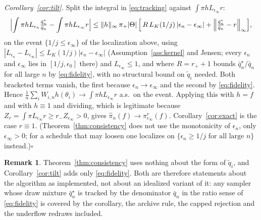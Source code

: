 \documentclass[10pt]{article}
\theoremstyle{plain}
\theoremstyle{definition}
\newtheorem{remark}{Remark}
\begin{document}
\emph{Corollary~\ref{cor:tilt}.} Split the integral in \eqref{eq:tracking} against $\int\pi hL_{\epsilon_\infty}r$:
\[
\Bigl|\int \pi h L_{\epsilon_n}\tfrac{\bar q^\star_n}{\bar q_n}-\int\pi hL_{\epsilon_\infty}r\Bigr|
\le \|h\|_\infty\,\pi_+|\Theta|\,\Bigl[\,R\,L_K(1/j)\,|\epsilon_n-\epsilon_\infty|
+\Bigl\|\tfrac{\bar q^\star_n}{\bar q_n}-r\Bigr\|_\infty\Bigr],
\]
on the event $\{1/j\le\epsilon_\infty\}$ of the localization above, using $|L_{\epsilon_n}-L_{\epsilon_\infty}|\le L_K(1/j)|\epsilon_n-\epsilon_\infty|$ (Assumption~\ref{ass:kernel} and Jensen; every $\epsilon_n$ and $\epsilon_\infty$ lies in $[1/j,\epsilon_0]$ there) and $L_{\epsilon_\infty}\le1$, and where $R=r_++1$ bounds $\bar q^\star_n/\bar q_n$ for all large $n$ by \eqref{eq:fidelity}, with no structural bound on $\tilde q_i$ needed. Both bracketed terms vanish, the first because $\epsilon_n\to\epsilon_\infty$ and the second by \eqref{eq:fidelity}. Hence $\tfrac1n\sum_iW_{i,n}h(\theta_i)\to\int\pi hL_{\epsilon_\infty}r$ a.s.\ on the event. Applying this with $h=f$ and with $h\equiv1$ and dividing, which is legitimate because $Z_r=\int\pi L_{\epsilon_\infty}r\ge r_-Z_{\epsilon_\infty}>0$, gives $\widehat\pi_n(f)\to\pi^r_{\epsilon_\infty}(f)$. Corollary~\ref{cor:exact} is the case $r\equiv1$. (Theorem~\ref{thm:consistency} does not use the monotonicity of $\epsilon_n$, only $\epsilon_\infty>0$; for a schedule that may loosen one localizes on $\{\epsilon_n\ge1/j\text{ for all large }n\}$ instead.)\hfill$\square$

\begin{remark}\label{rem:weaker-c4}
Theorem~\ref{thm:consistency} uses nothing about the form of $\tilde q_i$, and Corollary~\ref{cor:tilt} adds only \eqref{eq:fidelity}. Both are therefore statements about the algorithm as implemented, not about an idealized variant of it: any sampler whose draw mixture $\bar q^\star_n$ is tracked by the denominator $\bar q_n$ in the ratio sense of \eqref{eq:fidelity} is covered by the corollary, the archive rule, the capped rejection and the underflow redraws included.
\end{remark}
\end{document}
